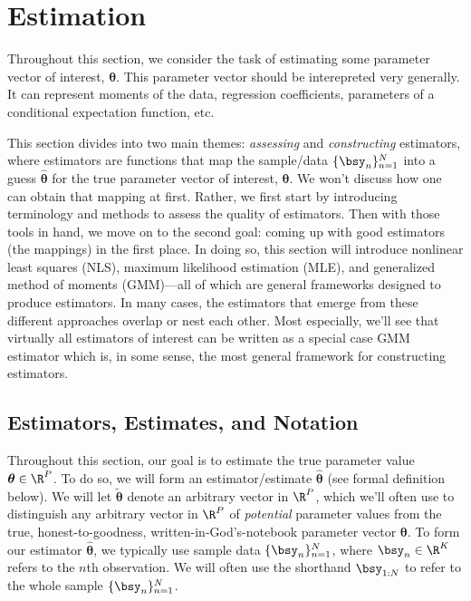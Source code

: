 \documentclass[12pt]{article}
\theoremstyle{plain}
\theoremstyle{definition}
\theoremstyle{remark}
\newcommand{\bstheta}{\boldsymbol{\theta}}
\newcommand{\bshattheta}{\boldsymbol{\hat{\theta}}}
\newcommand{\bstildetheta}{\boldsymbol{\tilde{\theta}}}
\newcommand{\nN}{_{n=1}^N}
\begin{document}
\clearpage
\section{Estimation}

Throughout this section, we consider the task of estimating some
parameter vector of interest, $\bstheta$. This parameter vector should
be interepreted very generally. It can represent moments of the data,
regression coefficients, parameters of a conditional expectation
function, etc.

This section divides into two main themes: \emph{assessing} and
\emph{constructing} estimators, where estimators are functions that map
the sample/data $\{\bsy_n\}\nN$ into a guess $\bshattheta$ for the true
parameter vector of interest, $\bstheta$.  We won't discuss how one can
obtain that mapping at first.  Rather, we first start by introducing
terminology and methods to assess the quality of estimators.  Then with
those tools in hand, we move on to the second goal: coming up with good
estimators (the mappings) in the first place. In doing so, this section
will introduce nonlinear least squares (NLS), maximum likelihood
estimation (MLE), and generalized method of moments (GMM)---all of which
are general frameworks designed to produce estimators. In many cases,
the estimators that emerge from these different approaches overlap or
nest each other. Most especially, we'll see that virtually all
estimators of interest can be written as a special case GMM estimator
which is, in some sense, the most general framework for constructing
estimators.


\subsection{Estimators, Estimates, and Notation}

Throughout this section, our goal is to estimate the true parameter
value $\bstheta\in\R^P$.  To do so, we will form an estimator/estimate
$\bshattheta$ (see formal definition below). We will let $\bstildetheta$
denote an arbitrary vector in $\R^P$, which we'll often use to
distinguish any arbitrary vector in $\R^P$ of \emph{potential} parameter
values from the true, honest-to-goodness, written-in-God's-notebook
parameter vector $\bstheta$.  To form our estimator $\bshattheta$, we
typically use sample data $\{\bsy_n\}\nN$, where $\bsy_n\in\R^K$ refers
to the $n$th observation.  We will often use the shorthand $\bsy_{1:N}$
to refer to the whole sample $\{\bsy_n\}\nN$.
\end{document}
